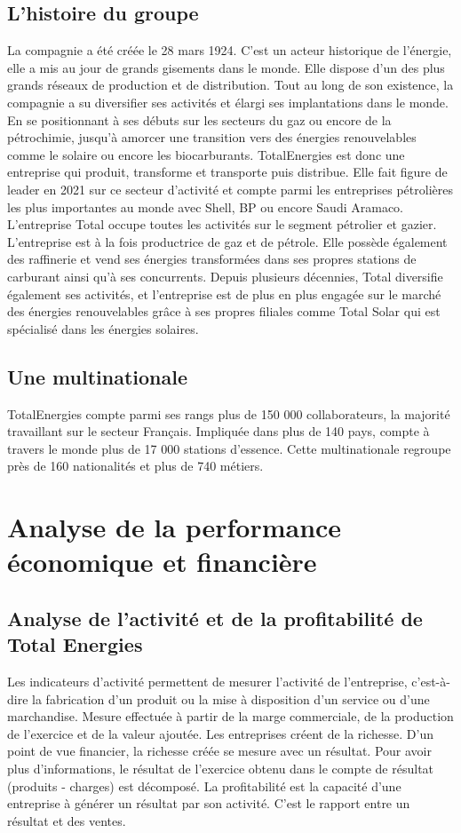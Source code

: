 \documentclass[12pt]{article}
\begin{document}
\subsection{L'histoire du groupe}
La compagnie a été créée le 28 mars 1924. C'est un acteur historique de l'énergie, elle a mis au jour de grands gisements dans le monde. Elle dispose d'un des plus grands réseaux de
production et de distribution. Tout au long de son existence, la compagnie a su diversifier ses activités et élargi ses implantations dans le monde. En se positionnant à ses débuts sur
les secteurs du gaz ou encore de la pétrochimie, jusqu'à amorcer une transition vers des énergies renouvelables comme le solaire ou encore les biocarburants. TotalEnergies est donc une
entreprise qui produit, transforme et transporte puis distribue. Elle fait figure de leader en 2021 sur ce secteur d'activité et compte parmi les entreprises pétrolières les plus
importantes au monde avec Shell, BP ou encore Saudi Aramaco. L'entreprise Total occupe toutes les activités sur le segment pétrolier et gazier. L'entreprise est à la fois productrice 
de gaz et de pétrole. Elle possède également des raffinerie et vend ses énergies transformées dans ses propres stations de carburant ainsi qu'à ses concurrents. Depuis plusieurs
décennies, Total diversifie également ses activités, et l'entreprise est de plus en plus engagée sur le marché des énergies renouvelables grâce à ses propres filiales comme Total Solar
qui est spécialisé dans les énergies solaires.

\subsection{Une multinationale}
TotalEnergies compte parmi ses rangs plus de 150 000 collaborateurs, la majorité travaillant sur le secteur Français. Impliquée dans plus de 140 pays, compte à travers le
monde plus de 17 000 stations d'essence. Cette multinationale regroupe près de 160 nationalités et plus de 740 métiers. 
\section{Analyse de la performance économique et financière}
\subsection{Analyse de l'activité et de la profitabilité de Total Energies}
Les indicateurs d'activité permettent de mesurer l'activité de l'entreprise, c'est-à-dire la fabrication d'un produit ou la mise à disposition d'un service ou d'une marchandise. Mesure 
effectuée à partir de la marge commerciale, de la production de l'exercice et de la valeur ajoutée.
Les entreprises créent de la richesse. D'un point de vue financier, la richesse créée se mesure avec un résultat. Pour avoir plus d'informations, le résultat de l'exercice obtenu dans
le compte de résultat (produits - charges) est décomposé. La profitabilité est la capacité d'une entreprise à générer un résultat par son activité. C'est le rapport entre un résultat
et des ventes.
\end{document}
